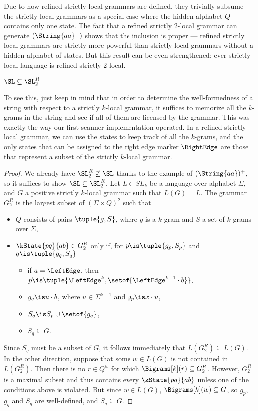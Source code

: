 Due to how refined strictly local grammars are defined, they trivially subsume the strictly local grammars as a special case where the hidden alphabet $Q$ contains only one state.
The fact that a refined strictly $2$-local grammar can generate $(\String{aa}^+)$ shows that the inclusion is proper --- refined strictly local grammars are strictly more powerful than strictly local grammars without a hidden alphabet of states.
But this result can be even strengthened: ever strictly local language is refined strictly $2$-local.
%
\begin{lemma}
    $\SL \subsetneq \SL_2^R$
\end{lemma}
%
To see this, just keep in mind that in order to determine the well-formedness of a string with respect to a strictly $k$-local grammar, it suffices to memorize all the $k$-grams in the string and see if all of them are licensed by the grammar.
This was exactly the way our first scanner implementation operated.
In a refined strictly local grammar, we can use the states to keep track of all the $k$-grams, and the only states that can be assigned to the right edge marker $\RightEdge$ are those that represent a subset of the strictly $k$-local grammar.

\begin{proof}
    We already have $\SL_2^R \not\subseteq \SL$ thanks to the example of $(\String{aa})^+$, so it suffices to show $\SL \subseteq \SL_2^R$.
    Let $L \in SL_k$ be a language over alphabet $\Sigma$, and $G$ a positive strictly $k$-local grammar such that $L(G) = L$.
    The grammar $G_2^R$ is the largest subset of $(\Sigma \times Q)^2$ such that
    \begin{itemize}
        \item $Q$ consists of pairs $\tuple{g,S}$, where $g$ is a $k$-gram and $S$ a set of $k$-grams over $\Sigma$,
        \item $\kState{pq}{ab} \in G_2^R$ only if, for $p \is \tuple{g_p,S_p}$ and $q \is \tuple{g_q,S_q}$
            \begin{itemize}
                \item if $a = \LeftEdge$, then $p \is \tuple{\LeftEdge^k, \setof{\LeftEdge^{k-1} \cdot b}}$,
                \item $g_q \is u \cdot b$, where $u \in \Sigma^{k-1}$ and $g_p \is x \cdot u$,
                \item $S_q \is S_p \cup \setof{g_q}$,
                \item $S_q \subseteq G$.
            \end{itemize}
    \end{itemize}
    
    Since $S_q$ must be a subset of $G$, it follows immediately that $L(G^R_2) \subseteq L(G)$. 
    In the other direction, suppose that some $w \in L(G)$ is not contained in $L(G^R_2)$.
    Then there is no $r \in Q^w$ for which $\Bigrams[k](r) \subseteq G^R_2$.
    However, $G^R_2$ is a maximal subset and thus contains every $\kState{pq}{ab}$ unless one of the conditions above is violated.
    But since $w \in L(G)$, $\Bigrams[k](w) \subseteq G$, so $g_p$, $g_q$ and $S_q$ are well-defined, and $S_q \subseteq G$.
\end{proof}

